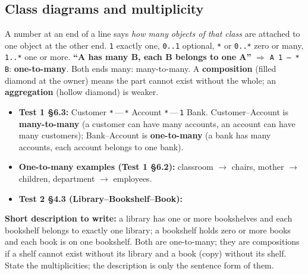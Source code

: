 \documentclass{fkt-notes}
\begin{document}
\subsection{Class diagrams and multiplicity}
\begin{rulebox}[title={Reading and writing multiplicities}]
  A number at an end of a line says \emph{how many objects of that class} are attached to one object at the other
  end. \texttt{1} exactly one, \texttt{0..1} optional, \texttt{*} or \texttt{0..*} zero or many, \texttt{1..*} one or more.
  \textbf{``A has many B, each B belongs to one A''} $\Rightarrow$ \texttt{A 1 --- * B}: \textbf{one-to-many}.
  Both ends many: many-to-many. A \textbf{composition} (filled diamond at the owner) means the part cannot exist
  without the whole; an \textbf{aggregation} (hollow diamond) is weaker.
\end{rulebox}
\begin{itemize}[nosep]
  \item \textbf{Test 1 \S6.3:} Customer \texttt{*}\,---\,\texttt{*} Account \texttt{*}\,---\,\texttt{1} Bank. Customer--Account is
        \textbf{many-to-many} (a customer can have many accounts, an account can have many customers);
        Bank--Account is \textbf{one-to-many} (a bank has many accounts, each account belongs to one bank).
  \item \textbf{One-to-many examples (Test 1 \S6.2):} classroom $\to$ chairs, mother $\to$ children, department $\to$ employees.
  \item \textbf{Test 2 \S4.3 (Library--Bookshelf--Book):}
\end{itemize}
\begin{center}
\end{center}
\textbf{Short description to write:} a library has one or more bookshelves and each bookshelf belongs to exactly one library;
a bookshelf holds zero or more books and each book is on one bookshelf. Both are one-to-many; they are compositions
if a shelf cannot exist without its library and a book (copy) without its shelf. State the multiplicities; the
description is only the sentence form of them.
\end{document}
